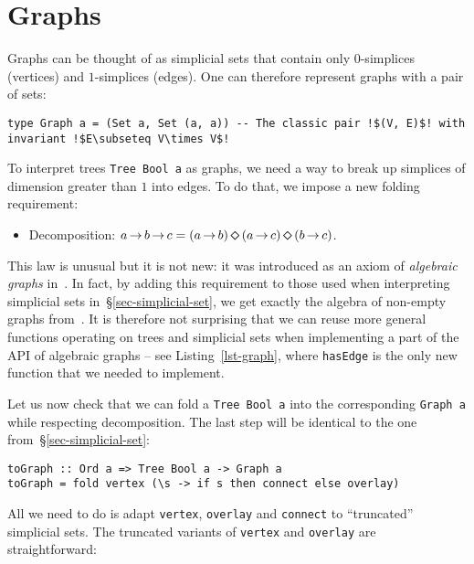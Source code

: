 \documentclass[english,submission]{programming}
\newcommand{\hcode}[1]{{\color{darkblue} \lstinline[keywordstyle={}]|#1|}} %
\newcommand{\dia}{\,\text{\raisebox{-0.3mm}{\Large $\diamond$}}\,}
\newcommand{\arr}{\,\text{$\rightarrow$}\,}
\begin{document}
\vspace{-2mm}
\section{Graphs}\label{sec-graph}

Graphs can be thought of as simplicial sets that contain only $0$-simplices
(vertices) and $1$-simplices (edges). One can therefore represent graphs with a
pair of sets:

\begin{lstlisting}
type Graph a = (Set a, Set (a, a)) -- The classic pair !$(V, E)$! with invariant !$E\subseteq V\times V$!
\end{lstlisting}

\noindent
To interpret trees \hcode{Tree Bool a} as graphs, we need a way to break up
simplices of dimension greater than $1$ into edges. To do that, we impose a new
folding requirement:

\begin{itemize}
    \item Decomposition:
          $a \arr b \arr c = (a \arr b) \dia (a \arr c) \dia (b \arr c)$.
\end{itemize}

\noindent
This law is unusual but it is not new: it was introduced as an axiom of
\emph{algebraic graphs} in~\cite{mokhov_alga}. In fact, by adding this
requirement to those used when interpreting simplicial sets
in~\S\ref{sec-simplicial-set}, we get exactly the algebra of non-empty graphs
from~\cite{mokhov_alga}. It is therefore not surprising that we can reuse more
general functions operating on trees and simplicial sets when implementing a
part of the API of algebraic graphs -- see Listing~\ref{lst-graph}, where
\hcode{hasEdge} is the only new function that we needed to implement.

Let us now check that we can fold a \hcode{Tree Bool a} into the corresponding
\hcode{Graph a} while respecting decomposition. The last step will be identical
to the one from~\S\ref{sec-simplicial-set}:

\begin{lstlisting}
toGraph :: Ord a => Tree Bool a -> Graph a
toGraph = fold vertex (\s -> if s then connect else overlay)
\end{lstlisting}

\noindent
All we need to do is adapt \hcode{vertex}, \hcode{overlay} and \hcode{connect}
to ``truncated'' simplicial sets. The truncated variants of \hcode{vertex} and
\hcode{overlay} are straightforward:
\end{document}
